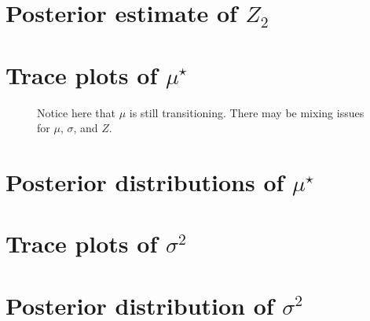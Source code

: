 \documentclass[10pt]{article} %
\begin{document}
\newpage
\section{Posterior estimate of $Z_2$}
\begin{figure}[H]
  \begin{center}  %
  \end{center}
  \label{fig:z2}
\end{figure}

\newpage
\section{Trace plots of $\mu^\star$}
\begin{figure}[H]
  \begin{center}  %
  \end{center}
  \label{fig:mutrace}
  \caption{Notice here that $\mu$ is still transitioning. There may be mixing
  issues for $\mu$, $\sigma$, and $Z$. }
\end{figure}

\newpage
\section{Posterior distributions of $\mu^\star$}
\begin{figure}[H]
  \begin{center}  %
  \end{center}
  \label{fig:mu}
\end{figure}

\newpage
\section{Trace plots of $\sigma^2$}
\begin{figure}[H]
  \begin{center}  %
  \end{center}
  \label{fig:sigtrace}
\end{figure}

\newpage
\section{Posterior distribution of $\sigma^2$}
\begin{figure}[H]
  \begin{center}  %
  \end{center}
  \label{fig:sig}
\end{figure}
\end{document}
